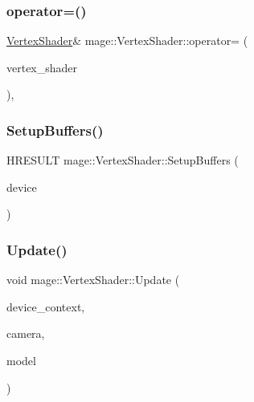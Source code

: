 \hypertarget{classmage_1_1_vertex_shader_a0094f5c2adb8377fa5c8d52e7a65136f}{}\label{classmage_1_1_vertex_shader_a0094f5c2adb8377fa5c8d52e7a65136f} 
\subsubsection{\texorpdfstring{operator=()}{operator=()}}
{\footnotesize\ttfamily \hyperlink{classmage_1_1_vertex_shader}{Vertex\+Shader}\& mage\+::\+Vertex\+Shader\+::operator= (\begin{DoxyParamCaption}\item[{const \hyperlink{classmage_1_1_vertex_shader}{Vertex\+Shader} \&}]{vertex\+\_\+shader }\end{DoxyParamCaption})\hspace{0.3cm}{\ttfamily [private]}, {\ttfamily [delete]}}

\hypertarget{classmage_1_1_vertex_shader_a02dec5ca8d933365397400da6046cdad}{}\label{classmage_1_1_vertex_shader_a02dec5ca8d933365397400da6046cdad} 
\subsubsection{\texorpdfstring{Setup\+Buffers()}{SetupBuffers()}}
{\footnotesize\ttfamily H\+R\+E\+S\+U\+LT mage\+::\+Vertex\+Shader\+::\+Setup\+Buffers (\begin{DoxyParamCaption}\item[{\hyperlink{namespacemage_ae74f374780900893caa5555d1031fd79}{Com\+Ptr}$<$ I\+D3\+D11\+Device2 $>$}]{device }\end{DoxyParamCaption})\hspace{0.3cm}{\ttfamily [protected]}}

\hypertarget{classmage_1_1_vertex_shader_a44074d7c56593ebdc2a8a931ecd7b9f6}{}\label{classmage_1_1_vertex_shader_a44074d7c56593ebdc2a8a931ecd7b9f6} 
\subsubsection{\texorpdfstring{Update()}{Update()}}
{\footnotesize\ttfamily void mage\+::\+Vertex\+Shader\+::\+Update (\begin{DoxyParamCaption}\item[{\hyperlink{namespacemage_ae74f374780900893caa5555d1031fd79}{Com\+Ptr}$<$ I\+D3\+D11\+Device\+Context2 $>$}]{device\+\_\+context,  }\item[{const \hyperlink{structmage_1_1_camera_transform_buffer}{Camera\+Transform\+Buffer} \&}]{camera,  }\item[{const \hyperlink{structmage_1_1_model_transform_buffer}{Model\+Transform\+Buffer} \&}]{model }\end{DoxyParamCaption})}



